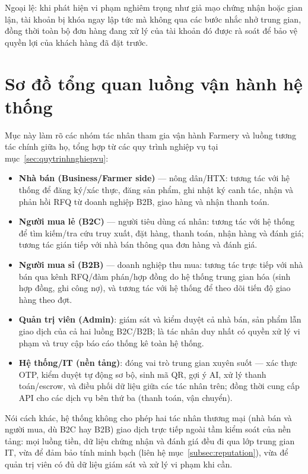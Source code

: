 Ngoại lệ: khi phát hiện vi phạm nghiêm trọng như giả mạo chứng nhận hoặc gian lận, tài khoản bị khóa ngay lập tức mà không qua các bước nhắc nhở trung gian, đồng thời toàn bộ đơn hàng đang xử lý của tài khoản đó được rà soát để bảo vệ quyền lợi của khách hàng đã đặt trước.



\section{Sơ đồ tổng quan luồng vận hành hệ thống}
\label{sec:luongvanhanh}

Mục này làm rõ các nhóm tác nhân tham gia vận hành Farmery và luồng tương tác chính giữa họ, tổng hợp từ các quy trình nghiệp vụ tại mục~\ref{sec:quytrinhnghiepvu}:

\begin{itemize}
    \item \textbf{Nhà bán (Business/Farmer side)} --- nông dân/HTX: tương tác với hệ thống để đăng ký/xác thực, đăng sản phẩm, ghi nhật ký canh tác, nhận và phản hồi RFQ từ doanh nghiệp B2B, giao hàng và nhận thanh toán.
    \item \textbf{Người mua lẻ (B2C)} --- người tiêu dùng cá nhân: tương tác với hệ thống để tìm kiếm/tra cứu truy xuất, đặt hàng, thanh toán, nhận hàng và đánh giá; tương tác gián tiếp với nhà bán thông qua đơn hàng và đánh giá.
    \item \textbf{Người mua sỉ (B2B)} --- doanh nghiệp thu mua: tương tác trực tiếp với nhà bán qua kênh RFQ/đàm phán/hợp đồng do hệ thống trung gian hóa (sinh hợp đồng, ghi công nợ), và tương tác với hệ thống để theo dõi tiến độ giao hàng theo đợt.
    \item \textbf{Quản trị viên (Admin)}: giám sát và kiểm duyệt cả nhà bán, sản phẩm lẫn giao dịch của cả hai luồng B2C/B2B; là tác nhân duy nhất có quyền xử lý vi phạm và truy cập báo cáo thống kê toàn hệ thống.
    \item \textbf{Hệ thống/IT (nền tảng)}: đóng vai trò trung gian xuyên suốt --- xác thực OTP, kiểm duyệt tự động sơ bộ, sinh mã QR, gợi ý AI, xử lý thanh toán/escrow, và điều phối dữ liệu giữa các tác nhân trên; đồng thời cung cấp API cho các dịch vụ bên thứ ba (thanh toán, vận chuyển).
\end{itemize}

Nói cách khác, hệ thống không cho phép hai tác nhân thương mại (nhà bán và người mua, dù B2C hay B2B) giao dịch trực tiếp ngoài tầm kiểm soát của nền tảng: mọi luồng tiền, dữ liệu chứng nhận và đánh giá đều đi qua lớp trung gian IT, vừa để đảm bảo tính minh bạch (liên hệ mục~\ref{subsec:reputation}), vừa để quản trị viên có đủ dữ liệu giám sát và xử lý vi phạm khi cần.

